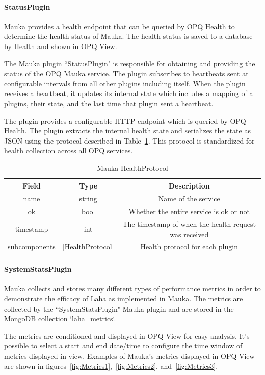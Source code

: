 \paragraph{StatusPlugin}
Mauka provides a health endpoint that can be queried by OPQ Health to determine the health status of Mauka. The health status is saved to a database by Health and shown in OPQ View.

The Mauka plugin ``StatusPlugin" is responsible for obtaining and providing the status of the OPQ Mauka service. The plugin subscribes to heartbeats sent at configurable intervals from all other plugins including itself. When the plugin receives a heartbeat, it updates its internal state which includes a mapping of all plugins, their state, and the last time that plugin sent a heartbeat.

The plugin provides a configurable HTTP endpoint which is queried by OPQ Health. The plugin extracts the internal health state and serializes the state as JSON using the protocol described in Table~\ref{table:HealthProtocol}. This protocol is standardized for health collection across all OPQ services.

\begin{table}[H]
	\centering
	\caption{Mauka HealthProtocol}
	\begin{tabular}{|c|c|c|}
		\hline
		Field & Type & Description \\
		\hline
		name & string & Name of the service \\
		\hline
		ok & bool & Whether the entire service is ok or not \\
		\hline
		timestamp & int & The timestamp of when the health request was received \\
		\hline
		subcomponents & [HealthProtocol] & Health protocol for each plugin \\
		\hline
	\end{tabular}
	\label{table:HealthProtocol}
\end{table}

\paragraph{SystemStatsPlugin}\label{lbl:SystemStatsPlugin}
Mauka collects and stores many different types of performance metrics in order to demonstrate the efficacy of Laha as implemented in Mauka. The metrics are collected by the ``SystemStatsPlugin" Mauka plugin and are stored in the MongoDB collection `laha\_metrics`.

The metrics are conditioned and displayed in OPQ View for easy analysis. It's possible to select a start and end date/time to configure the time window of metrics displayed in view. Examples of Mauka's metrics displayed in OPQ View are shown in figures~\ref{fig:Metrics1},~\ref{fig:Metrics2}, and~\ref{fig:Metrics3}.

